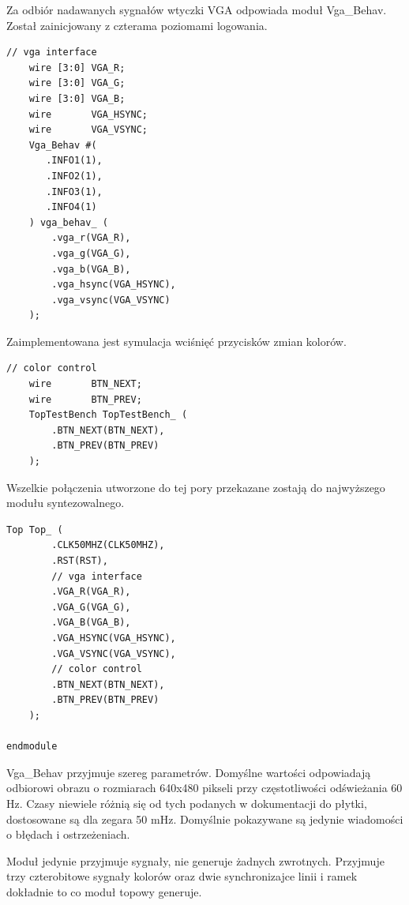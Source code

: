 \documentclass[a4paper,12pt]{article}
\begin{document}
Za odbiór nadawanych sygnałów wtyczki VGA odpowiada moduł Vga\_Behav. Został zainicjowany z czterama poziomami logowania.
\begin{lstlisting}[label=Syncvga,caption=Sync.v,firstnumber=11]
    // vga interface
    wire [3:0] VGA_R;
    wire [3:0] VGA_G;
    wire [3:0] VGA_B;
    wire       VGA_HSYNC;
    wire       VGA_VSYNC;
    Vga_Behav #(
       .INFO1(1),
       .INFO2(1),
       .INFO3(1),
       .INFO4(1)
    ) vga_behav_ (
        .vga_r(VGA_R),
        .vga_g(VGA_G),
        .vga_b(VGA_B),
        .vga_hsync(VGA_HSYNC),
        .vga_vsync(VGA_VSYNC)
    );
\end{lstlisting}

Zaimplementowana jest symulacja wciśnięć przycisków zmian kolorów.
\begin{lstlisting}[label=Syncvga,caption=Sync.v,firstnumber=30]
    // color control
    wire       BTN_NEXT;
    wire       BTN_PREV;
    TopTestBench TopTestBench_ (
        .BTN_NEXT(BTN_NEXT),
        .BTN_PREV(BTN_PREV)
    );
\end{lstlisting}

Wszelkie połączenia utworzone do tej pory przekazane zostają do najwyższego modułu syntezowalnego.
\begin{lstlisting}[label=Syncvga,caption=Sync.v,firstnumber=38]
    Top Top_ (
        .CLK50MHZ(CLK50MHZ),
        .RST(RST),
        // vga interface
        .VGA_R(VGA_R),
        .VGA_G(VGA_G),
        .VGA_B(VGA_B),
        .VGA_HSYNC(VGA_HSYNC),
        .VGA_VSYNC(VGA_VSYNC),
        // color control
        .BTN_NEXT(BTN_NEXT),
        .BTN_PREV(BTN_PREV)
    );

endmodule
\end{lstlisting}

Vga\_Behav przyjmuje szereg parametrów. Domyślne wartości odpowiadają odbiorowi obrazu o rozmiarach 640x480 pikseli przy częstotliwości odświeżania 60 Hz. Czasy niewiele różnią się od tych podanych w dokumentacji do płytki, dostosowane są dla zegara 50 mHz. Domyślnie pokazywane są jedynie wiadomości o błędach i ostrzeżeniach.

Moduł jedynie przyjmuje sygnały, nie generuje żadnych zwrotnych. Przyjmuje trzy czterobitowe sygnały kolorów oraz dwie synchronizajce linii i ramek dokładnie to co moduł topowy generuje.
\end{document}
